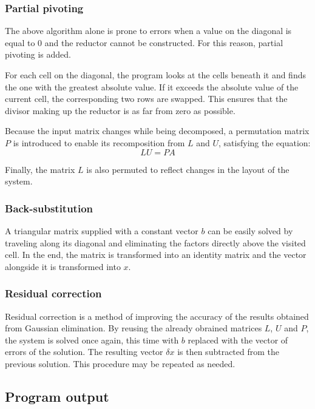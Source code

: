 \documentclass{article}
\begin{document}
	\subsubsection{Partial pivoting}
	
	The above algorithm alone is prone to errors when a value on the diagonal is
	equal to $0$ and the reductor cannot be constructed. For this reason,
	partial pivoting is added.
	
	For each cell on the diagonal, the program looks at the cells beneath it and
	finds the one with the greatest absolute value. If it exceeds the absolute
	value of the current cell, the corresponding two rows are swapped. This
	ensures that the divisor making up the reductor is as far from zero as
	possible.
	
	Because the input matrix changes while being decomposed, a permutation
	matrix $P$ is introduced to enable its recomposition from $L$ and $U$,
	satisfying the equation:
	\begin{equation}
		LU = PA
	\end{equation}
	
	Finally, the matrix $L$ is also permuted to reflect changes in the layout
	of the system.
	
	\subsubsection{Back-substitution}
	
	A triangular matrix supplied with a constant vector $b$ can be easily solved
	by traveling along its diagonal and eliminating the factors directly above
	the visited cell. In the end, the matrix is transformed into an identity
	matrix and the vector alongside it is transformed into $x$.
	
	\subsubsection{Residual correction}
	
	Residual correction is a method of improving the accuracy of the results
	obtained from Gaussian elimination. By reusing the already obrained matrices
	$L$, $U$ and $P$, the system is solved once again, this time with $b$
	replaced with the vector of errors of the solution. The resulting vector
	$\delta x$ is then subtracted from the previous solution. This procedure may
	be repeated as needed.
	
	\subsection{Program output}
	
\end{document}
